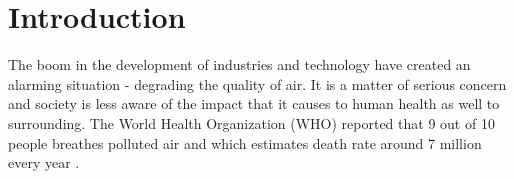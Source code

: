 \chapter{Introduction}
\setcounter{page}{1}

The boom in the development of industries and technology have created an alarming situation - degrading the quality of air. It is a matter of serious concern and society is less aware of the impact that it causes to human health as well to surrounding. The World Health Organization (WHO) reported that 9 out of 10 people breathes polluted air and  which estimates death rate around 7 million every year \cite{who} \cite{WHO2010}. 
